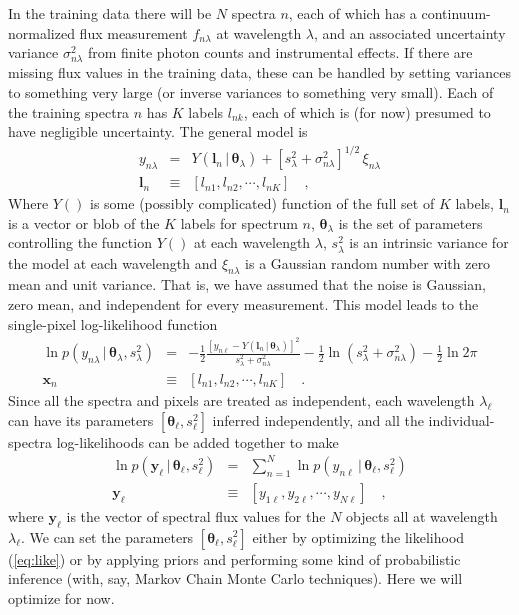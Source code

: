\documentclass[12pt, preprint]{aastex}
\newcommand{\set}[1]{\bm{#1}}
\newcommand{\given}{\,|\,}
\begin{document}
In the training data there will be $N$ spectra $n$, each of which has
a continuum-normalized flux measurement $f_{n\lambda}$ at wavelength
$\lambda$, and an associated uncertainty variance
$\sigma_{n\lambda}^2$ from finite photon counts and instrumental effects.
If there are missing flux values in the training data, these can be
handled by setting variances to something very large (or inverse
variances to something very small).
Each of the training spectra $n$ has $K$ labels $l_{nk}$, each of which
is (for now) presumed to have negligible uncertainty.
The general model is
\begin{eqnarray}
y_{n\lambda} &=&
Y(\set{l}_n\given\set{\theta}_\lambda) + [s_\lambda^2 + \sigma_{n\lambda}^2]^{1/2}\,\xi_{n\lambda}
\label{eq:model}\\
\set{l}_n &\equiv& [l_{n1}, l_{n2}, \cdots, l_{nK}]
\quad,
\end{eqnarray}
Where $Y()$ is some (possibly complicated) function of the full set
of $K$ labels, $\set{l}_n$ is a vector or blob of the $K$ labels for spectrum $n$,
$\set{\theta}_\lambda$ is the set of parameters controlling the
function $Y()$ at each wavelength $\lambda$, $s_\lambda^2$ is an
intrinsic variance for the model at each wavelength and
$\xi_{n\lambda}$ is a Gaussian random number with zero mean and unit
variance.
That is, we have assumed that the noise is Gaussian, zero mean, and
independent for every measurement.
This model leads to the single-pixel log-likelihood function
\begin{eqnarray}
\ln p(y_{n\lambda}\given\set{\theta}_\lambda,s_\lambda^2) &=&
 -\frac{1}{2}\frac{[y_{n\ell} - Y(\set{l}_n\given\set{\theta}_\lambda)]^2}{s_\lambda^2 + \sigma_{n\lambda}^2}
 -\frac{1}{2}\ln(s_\lambda^2 + \sigma_{n\lambda}^2)
 -\frac{1}{2}\ln 2\pi
\label{eq:like1}\\
\set{x}_n &\equiv& [l_{n1}, l_{n2}, \cdots, l_{nK}]
\quad.
\end{eqnarray}
Since all the spectra and pixels are treated as independent, each
wavelength $\lambda_\ell$ can have its parameters
$[\set{\theta}_\ell,s_\ell^2]$ inferred independently, and all the
individual-spectra log-likelihoods can be added together to make
\begin{eqnarray}
\ln p(\set{y}_\ell\given\set{\theta}_\ell,s_\ell^2) &=&
 \sum_{n=1}^N \ln p(y_{n\ell}\given\set{\theta}_\ell,s_\ell^2)
\label{eq:like}\\
\set{y}_\ell &\equiv& [y_{1\ell}, y_{2\ell}, \cdots, y_{N\ell}]
\quad,
\end{eqnarray}
where $\set{y}_\ell$ is the vector of spectral flux values for
the $N$ objects all at wavelength $\lambda_\ell$.
We can set the parameters $[\set{\theta}_\ell,s_\ell^2]$ either by
optimizing the likelihood (\ref{eq:like}) or by applying priors and
performing some kind of probabilistic inference (with, say, Markov
Chain Monte Carlo techniques).
Here we will optimize for now.
\end{document}
